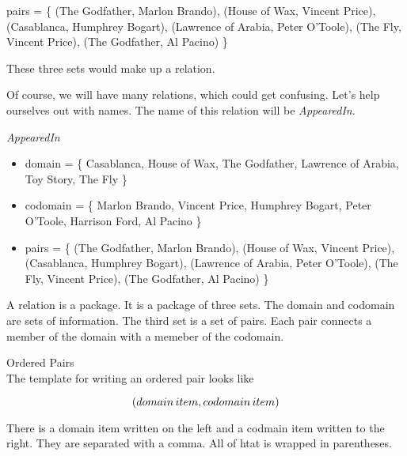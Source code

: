 \documentclass{ximera}
\begin{document}
\begin{center} 
pairs = \{ (The Godfather, Marlon Brando), (House of Wax, Vincent Price), (Casablanca, Humphrey Bogart), (Lawrence of Arabia, Peter O'Toole), (The Fly, Vincent Price), (The Godfather, Al Pacino) \} 
\end{center}


These three sets would make up a relation. 

Of course, we will have many relations, which could get confusing.  Let's help ourselves out with names.  The name of this relation will be \textit{AppearedIn}.


\begin{example} \textit{AppearedIn} \\
\begin{itemize}
\item domain = \{ Casablanca, House of Wax,  The Godfather, Lawrence of Arabia, Toy Story, The Fly \}  
\item codomain = \{ Marlon Brando, Vincent Price, Humphrey Bogart, Peter O'Toole, Harrison Ford, Al Pacino  \} 
\item pairs = \{ (The Godfather, Marlon Brando), (House of Wax, Vincent Price), (Casablanca, Humphrey Bogart), (Lawrence of Arabia, Peter O'Toole), (The Fly, Vincent Price), (The Godfather, Al Pacino) \} 
\end{itemize}
\end{example}


A relation is a package.  It is a package of three sets. The domain and codomain are sets of information.  The third set is a set of pairs.  Each pair connects a member of the domain with a memeber of the codomain. 


\begin{template} Ordered Pairs \\
The template for writing an ordered pair looks like  

\[
\large{( domain \, item, codomain \, item )}
\]
\end{template}

There is a domain item written on the left and a codmain item written to the right.  They are separated with a comma.  All of htat is wrapped in parentheses.
\end{document}
